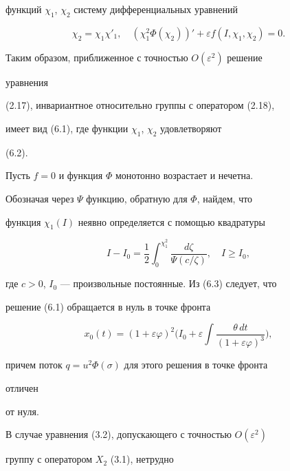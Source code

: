 функций $\chi_1$, $\chi_2$ систему дифференциальных уравнений 


\begin{equation} 


\chi_2=\chi_1\chi'_1,\quad 


(\chi^2_1\Phi(\chi_2))'+\varepsilon f(I,\chi_1,\chi_2)=0.\tag{6.2} 


\end{equation} 


Таким образом, приближенное с точностью $O(\varepsilon^2)$ решение 


уравнения 


(2.17), инвариантное относительно группы с оператором (2.18), 


имеет вид (6.1), где функции $\chi_1$, $\chi_2$ удовлетворяют 


(6.2). 


 


Пусть $f=0$ и функция $\Phi$ монотонно возрастает и нечетна. 


Обозначая через $\Psi$ функцию, обратную для $\Phi$, найдем, что 


функция $\chi_1(I)$ неявно определяется с помощью квадратуры 


\begin{equation} 


I-I_0=\frac{1}{2}\int^{\chi^2_1}_0 


\frac{d\zeta}{\Psi(c/\zeta)},\quad I\ge I_0,\tag{6.3} 


\end{equation} 


где $c>0$, $I_0$ --- произвольные постоянные. Из (6.3) следует, что 


решение (6.1) обращается в нуль в точке фронта 


$$ 


x_0(t)=(1+\varepsilon\varphi)^2\bigg(I_0+\varepsilon 


\int\frac{\theta\,dt}{(1+\varepsilon\varphi)^3}\bigg), 


$$ 


причем поток $q=u^2\Phi(\sigma)$ для этого решения в точке фронта 


отличен 


от нуля. 


 


В случае уравнения (3.2), допускающего с точностью $O(\varepsilon^2)$ 


группу с оператором $X_2$ (3.1), нетрудно 


